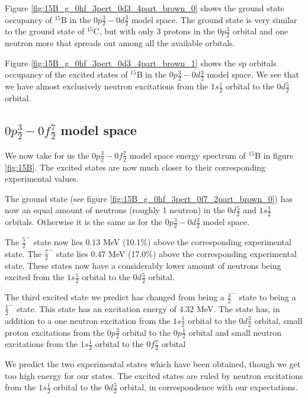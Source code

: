 Figure \ref{fig:15B_g_0hf_3pert_0d3_4part_brown_0} shows the ground state
occupancy of $^{15}$B in the $0p\frac32-0d\frac32$ model space. The ground
state is very similar to the ground state of $^{15}$C, but with only 3 protons
in the $0p\frac32$ orbital and one neutron more that spreads out among all the
available orbitals.

Figure \ref{fig:15B_g_0hf_3pert_0d3_4part_brown_1} shows the sp orbitals
occupancy of the excited states of $^{15}$B in the $0p\frac32-0d\frac32$ model
space. We see that we have almost exclusively neutron excitations from the
$1s\frac12$ orbital to the $0d\frac52$ orbital.

\subsection{$0p\frac32-0f\frac72$ model space}

We now take for us the $0p\frac32-0f\frac72$ model space energy spectrum of
$^{15}$B in figure \ref{fig:15B}. The excited states are now much closer to
their corresponding experimental values.

The ground state (see figure \ref{fig:15B_g_0hf_3pert_0f7_2part_brown_0}) has
now an equal amount of neutrons (roughly 1 neutron) in the $0d\frac52$ and
$1s\frac12$ orbitals. Otherwise it is the same as for the $0p\frac32-0d\frac32$
model space.

The $\frac52^-$ state now lies 0.13 MeV (10.1\%) above the corresponding
experimental state. The $\frac72^-$ state lies 0.47 MeV (17.0\%) above the
corresponding experimental state. These states now have a considerably lower
amount of neutrons being excited from the $1s\frac12$ orbital to the $0d\frac52$
orbital.

The third excited state we predict has changed from being a $\frac32^-$ state
to being a $\frac12^-$ state. This state has an excitation energy of 4.32 MeV.
The state has, in addition to a one neutron excitation from the $1s\frac12$
orbital to the $0d\frac32$ orbital, small proton excitations from the $0p\frac32$
orbital to the $0p\frac12$ orbital and small neutron excitations from the
$1s\frac12$ orbital to the $0f\frac72$ orbital

We predict the two experimental states which have been obtained, though we get too high energy
for our states. The excited states are ruled by neutron excitations from the
$1s\frac12$ orbital to the $0d\frac52$ orbital, in correspondence with our
expectations.






